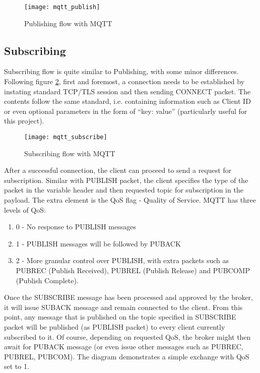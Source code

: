 \begin{figure}[ht]
    \centering
    \texttt{[image: mqtt\_publish]}
    \caption{Publishing flow with MQTT}
    \label{fig:mqtt_publish}
\end{figure}


\subsection{Subscribing}

Subscribing flow is quite similar to Publishing, with some minor differences. Following figure \ref{fig:mqtt_subscribe}, first and foremost, a connection needs to be established by instating standard TCP/TLS session and then sending CONNECT packet. The contents follow the same standard, i.e. containing information such as Client ID or even optional parameters in the form of ``key: value'' (particularly useful for this project).

\begin{figure}[ht]
    \centering
    \texttt{[image: mqtt\_subscribe]}
    \caption{Subscribing flow with MQTT}
    \label{fig:mqtt_subscribe}
\end{figure}

After a successful connection, the client can proceed to send a request for subscription. Similar with PUBLISH packet, the client specifies the type of the packet in the variable header and then requested topic for subscription in the payload. The extra element is the QoS flag - Quality of Service. MQTT has three levels of QoS:
\begin{enumerate}
  \item 0 - No response to PUBLISH messages
  \item 1 - PUBLISH messages will be followed by PUBACK
  \item 2 - More granular control over PUBLISH, with extra packets such as PUBREC (Publish Received), PUBREL (Publish Release) and PUBCOMP (Publish Complete).
\end{enumerate}

Once the SUBSCRIBE message has been processed and approved by the broker, it will issue SUBACK message and remain connected to the client. From this point, any message that is published on the topic specified in SUBSCRIBE packet will be published (as PUBLISH packet) to every client currently subscribed to it. Of course, depending on requested QoS, the broker might then await for PUBACK message (or even issue other messages such as PUBREC, PUBREL, PUBCOM). The diagram demonstrates a simple exchange with QoS set to 1. 

